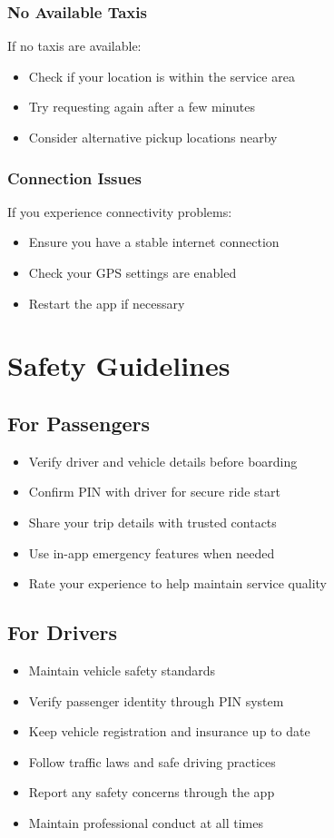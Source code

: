 \documentclass[12pt]{article}
\begin{document}
\subsubsection{No Available Taxis}
If no taxis are available:
\begin{itemize}
    \item Check if your location is within the service area
    \item Try requesting again after a few minutes
    \item Consider alternative pickup locations nearby
\end{itemize}

\subsubsection{Connection Issues}
If you experience connectivity problems:
\begin{itemize}
    \item Ensure you have a stable internet connection
    \item Check your GPS settings are enabled
    \item Restart the app if necessary
\end{itemize}

\newpage
\section{Safety Guidelines}

\subsection{For Passengers}
\begin{itemize}
    \item Verify driver and vehicle details before boarding
    \item Confirm PIN with driver for secure ride start
    \item Share your trip details with trusted contacts
    \item Use in-app emergency features when needed
    \item Rate your experience to help maintain service quality
\end{itemize}

\subsection{For Drivers}
\begin{itemize}
    \item Maintain vehicle safety standards
    \item Verify passenger identity through PIN system
    \item Keep vehicle registration and insurance up to date
    \item Follow traffic laws and safe driving practices
    \item Report any safety concerns through the app
    \item Maintain professional conduct at all times
\end{itemize}
\end{document}
